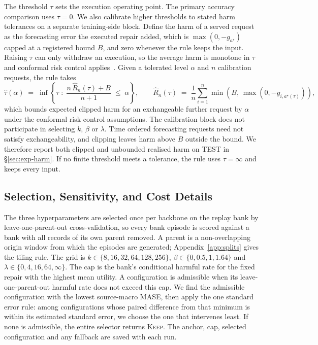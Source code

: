 \documentclass{article}
\begin{document}
The threshold $\tau$ sets the execution operating point. The primary accuracy comparison
uses $\tau=0$. We also calibrate higher thresholds to stated harm tolerances on a separate
training-side block. Define the harm of a served request as the
forecasting error the executed repair added, which is $\max(0, -g_{a^{\star}})$ capped at a
registered bound $B$, and zero whenever the rule keeps the input. Raising $\tau$ can only
withdraw an execution, so the average harm is monotone in $\tau$ and conformal risk
control applies~\citep{angelopoulos2024conformal}. Given a tolerated
level $\alpha$ and $n$ calibration requests, the rule takes
\begin{equation}
  \hat\tau(\alpha) \;=\; \inf\left\{ \tau \;:\;
    \frac{n\, \hat{R}_n(\tau) + B}{n+1} \;\le\; \alpha \right\},
  \qquad
  \hat{R}_n(\tau) \;=\; \frac{1}{n}\sum_{i=1}^{n} \min\!\left(B,\, \max(0, -g_{i,a^{\star}(\tau)})\right),
  \label{eq:crc}
\end{equation}
which bounds expected clipped harm for an exchangeable further request by $\alpha$ under
the conformal risk control assumptions. The calibration block does not participate in
selecting $k$, $\beta$ or $\lambda$. Time ordered forecasting requests need not satisfy
exchangeability, and clipping leaves harm above $B$ outside the bound. We therefore report
both clipped and unbounded realised harm on TEST in \S\ref{sec:exp-harm}. If no finite
threshold meets a tolerance, the rule uses $\tau=\infty$ and keeps every input.




\subsection{Selection, Sensitivity, and Cost Details}
The three hyperparameters are selected once per backbone on the replay bank by
leave-one-parent-out cross-validation, so every bank episode is scored against a bank with all
records of its own parent removed. A parent is a non-overlapping origin window from which the
episodes are generated; Appendix~\ref{app:splits} gives the tiling rule. The grid is
$k \in \{8,16,32,64,128,256\}$, $\beta \in \{0,0.5,1,1.64\}$ and
$\lambda \in \{0,4,16,64,\infty\}$. The cap is the bank's conditional harmful rate for
the fixed repair with the highest mean utility. A configuration is admissible when its
leave-one-parent-out harmful rate does not exceed this cap. We find the admissible
configuration with the lowest source-macro MASE, then apply the one standard error rule:
among configurations whose paired difference from that minimum is within its estimated
standard error, we choose the one that intervenes least. If none is admissible, the entire
selector returns \textsc{Keep}. The anchor, cap, selected configuration and any fallback
are saved with each run.
\end{document}

